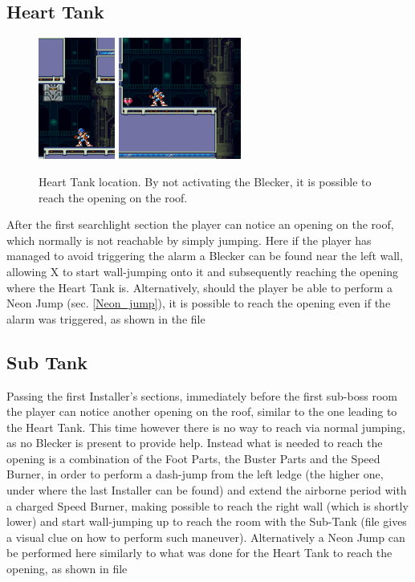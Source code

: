 \subsection{Heart Tank}
\begin{figure}[htp]
	\centering
	\includegraphics[height=4cm]{figures/X2/Magna_centipede/Centipede_heart_1.png}
	\includegraphics[height=4cm]{figures/X2/Magna_centipede/Centipede_heart_2.png}
	\caption{Heart Tank location. By not activating the Blecker, it is possible to reach the opening on the roof.}
\end{figure}
After the first searchlight section the player can notice an opening on the roof, which normally is not reachable by simply jumping. Here if the player has managed to avoid triggering the alarm a Blecker can be found near the left wall, allowing X to start wall-jumping onto it and subsequently reaching the opening where the Heart Tank is. Alternatively, should the player be able to perform a Neon Jump (sec. \ref{Neon_jump}), it is possible to reach the opening even if the alarm was triggered, as shown in the file 

\subsection{Sub Tank}
Passing the first Installer's sections, immediately before the first sub-boss room the player can notice another opening on the roof, similar to the one leading to the Heart Tank. This time however there is no way to reach via normal jumping, as no Blecker is present to provide help. Instead what is needed to reach the opening is a combination of the Foot Parts, the Buster Parts and the Speed Burner, in order to perform a dash-jump from the left ledge (the higher one, under where the last Installer can be found) and extend the airborne period with a charged Speed Burner, making possible to reach the right wall (which is shortly lower) and start wall-jumping up to reach the room with the Sub-Tank (file  gives a visual clue on how to perform such maneuver). Alternatively a Neon Jump can be performed here similarly to what was done for the Heart Tank to reach the opening, as shown in file 

